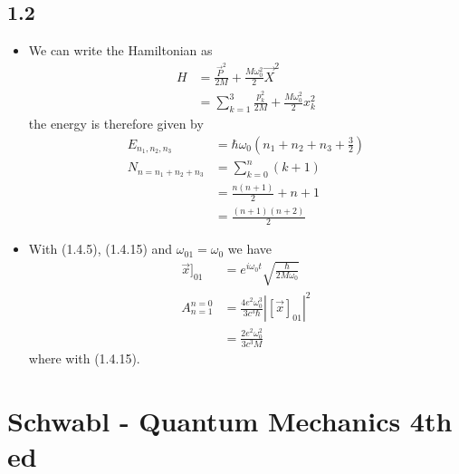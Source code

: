 \documentclass[10pt,a4paper]{book}
\theoremstyle{definition}
\begin{document}
\subsection{1.2}
\begin{itemize}
\item We can write the Hamiltonian as
\begin{align}
    H&=\frac{\vec{P}^2}{2M}+\frac{M\omega_0^2}{2}\vec{X}^2\\
    &=\sum_{k=1}^3\frac{p_k^2}{2M}+\frac{M\omega_0^2}{2}x_k^2
\end{align}
the energy is therefore given by
\begin{align}
    E_{n_1,n_2,n_3}&=\hbar\omega_0\left(n_1+n_2+n_3+\frac{3}{2}\right)\\
    N_{n=n_1+n_2+n_3}&=\sum_{k=0}^{n}(k+1)\\
    &=\frac{n(n+1)}{2}+n+1\\
    &=\frac{(n+1)(n+2)}{2}
\end{align}

\item With (1.4.5), (1.4.15) and $\omega_{01}=\omega_0$ we have
\begin{align}
    \vec{x}]_{01}&=e^{i\omega_0 t}\sqrt{\frac{\hbar}{2M\omega_0}}\\
    A_{n=1}^{n=0}&=\frac{4e^2\omega_0^3}{3c^3\hbar}\left|[\vec{x}]_{01}\right|^2\\
    &=\frac{2e^2\omega_0^2}{3c^3M}
\end{align}
where with (1.4.15).
\end{itemize}

\section{{\sc Schwabl} - Quantum Mechanics 4th ed}
\end{document}
